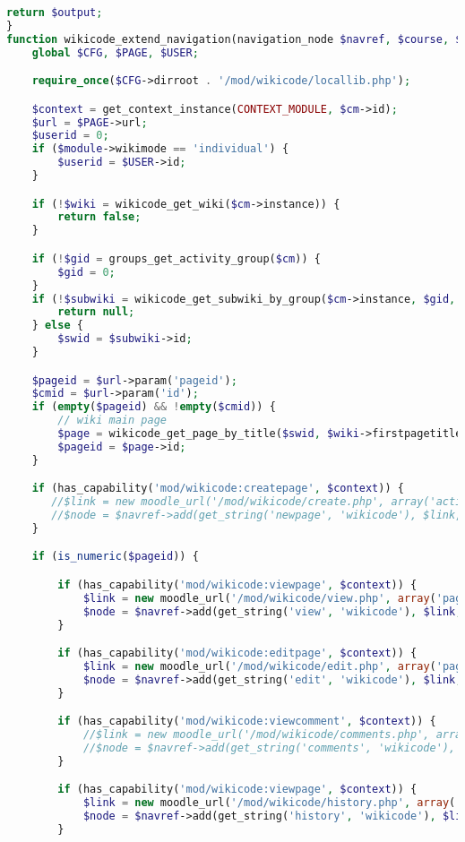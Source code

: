 \begin{lstlisting}[language=PHP]
    return $output;
}
function wikicode_extend_navigation(navigation_node $navref, $course, $module, $cm) {
    global $CFG, $PAGE, $USER;

    require_once($CFG->dirroot . '/mod/wikicode/locallib.php');

    $context = get_context_instance(CONTEXT_MODULE, $cm->id);
    $url = $PAGE->url;
    $userid = 0;
    if ($module->wikimode == 'individual') {
        $userid = $USER->id;
    }

    if (!$wiki = wikicode_get_wiki($cm->instance)) {
        return false;
    }

    if (!$gid = groups_get_activity_group($cm)) {
        $gid = 0;
    }
    if (!$subwiki = wikicode_get_subwiki_by_group($cm->instance, $gid, $userid)) {
        return null;
    } else {
        $swid = $subwiki->id;
    }

    $pageid = $url->param('pageid');
    $cmid = $url->param('id');
    if (empty($pageid) && !empty($cmid)) {
        // wiki main page
        $page = wikicode_get_page_by_title($swid, $wiki->firstpagetitle);
        $pageid = $page->id;
    }

    if (has_capability('mod/wikicode:createpage', $context)) {
       //$link = new moodle_url('/mod/wikicode/create.php', array('action' => 'new', 'swid' => $swid));
       //$node = $navref->add(get_string('newpage', 'wikicode'), $link, navigation_node::TYPE_SETTING);
    }

    if (is_numeric($pageid)) {

        if (has_capability('mod/wikicode:viewpage', $context)) {
            $link = new moodle_url('/mod/wikicode/view.php', array('pageid' => $pageid));
            $node = $navref->add(get_string('view', 'wikicode'), $link, navigation_node::TYPE_SETTING);
        }

        if (has_capability('mod/wikicode:editpage', $context)) {
            $link = new moodle_url('/mod/wikicode/edit.php', array('pageid' => $pageid));
            $node = $navref->add(get_string('edit', 'wikicode'), $link, navigation_node::TYPE_SETTING);
        }

        if (has_capability('mod/wikicode:viewcomment', $context)) {
            //$link = new moodle_url('/mod/wikicode/comments.php', array('pageid' => $pageid));
            //$node = $navref->add(get_string('comments', 'wikicode'), $link, navigation_node::TYPE_SETTING);
        }

        if (has_capability('mod/wikicode:viewpage', $context)) {
            $link = new moodle_url('/mod/wikicode/history.php', array('pageid' => $pageid));
            $node = $navref->add(get_string('history', 'wikicode'), $link, navigation_node::TYPE_SETTING);
        }


\end{lstlisting}
